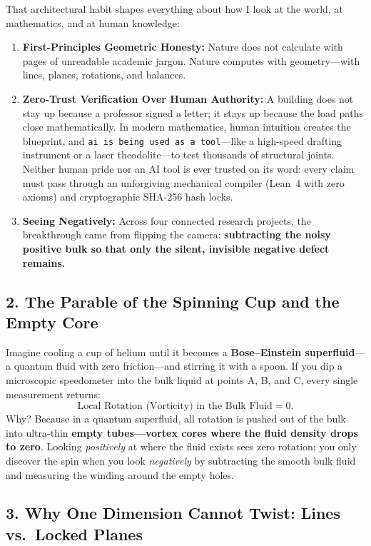 \documentclass[11pt,a4paper]{article}
\begin{document}
That architectural habit shapes everything about how I look at the world, at mathematics, and at human knowledge:
\begin{enumerate}[leftmargin=1.6em]
  \item \textbf{First-Principles Geometric Honesty:} Nature does not calculate with pages of unreadable academic jargon. Nature computes with geometry---with lines, planes, rotations, and balances.
  \item \textbf{Zero-Trust Verification Over Human Authority:} A building does not stay up because a professor signed a letter; it stays up because the load paths close mathematically. In modern mathematics, human intuition creates the blueprint, and \texttt{ai is being used as a tool}---like a high-speed drafting instrument or a laser theodolite---to test thousands of structural joints. Neither human pride nor an AI tool is ever trusted on its word: every claim must pass through an unforgiving mechanical compiler (Lean~4 with zero axioms) and cryptographic SHA-256 hash locks.
  \item \textbf{Seeing Negatively:} Across four connected research projects, the breakthrough came from flipping the camera: \textbf{subtracting the noisy positive bulk so that only the silent, invisible negative defect remains.}
\end{enumerate}

\subsection*{2. The Parable of the Spinning Cup and the Empty Core}

Imagine cooling a cup of helium until it becomes a \textbf{Bose--Einstein superfluid}---a quantum fluid with zero friction---and stirring it with a spoon. If you dip a microscopic speedometer into the bulk liquid at points A, B, and C, every single measurement returns:
\[
  \text{Local Rotation (Vorticity) in the Bulk Fluid} = 0.
\]
Why? Because in a quantum superfluid, all rotation is pushed out of the bulk into ultra-thin \textbf{empty tubes---vortex cores where the fluid density drops to zero}. Looking \emph{positively} at where the fluid exists sees zero rotation; you only discover the spin when you look \emph{negatively} by subtracting the smooth bulk fluid and measuring the winding around the empty holes.

\subsection*{3. Why One Dimension Cannot Twist: Lines vs.\ Locked Planes}
\end{document}
